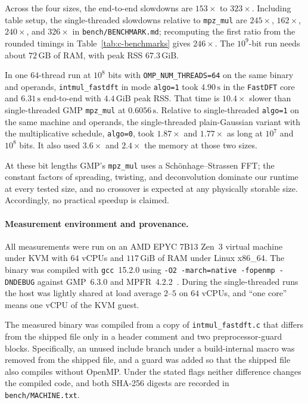 Across the four sizes, the end-to-end slowdowns are $153\times$ to $323\times$. Including table setup, the single-threaded slowdowns relative to \texttt{mpz\_mul} are $245\times$, $162\times$, $240\times$, and $326\times$ in \texttt{bench/\allowbreak BENCHMARK.md}; recomputing the first ratio from the rounded timings in Table~\ref{tab:c-benchmarks} gives $246\times$. The $10^9$-bit run needs about $72\,\mathrm{GB}$ of RAM, with peak RSS $67.3\,\mathrm{GiB}$.

In one $64$-thread run at $10^8$ bits with \texttt{OMP\_NUM\_THREADS=64} on the same binary and operands, \texttt{intmul\_fastdft} in mode \texttt{algo=1} took $4.90\,\mathrm{s}$ in the \texttt{FastDFT} core and $6.31\,\mathrm{s}$ end-to-end with $4.4\,\mathrm{GiB}$ peak RSS. That time is $10.4\times$ slower than single-threaded GMP \texttt{mpz\_mul} at $0.6056\,\mathrm{s}$. Relative to single-threaded \texttt{algo=1} on the same machine and operands, the single-threaded plain-Gaussian variant with the multiplicative schedule, \texttt{algo=0}, took $1.87\times$ and $1.77\times$ as long at $10^7$ and $10^8$ bits. It also used $3.6\times$ and $2.4\times$ the memory at those two sizes.

At these bit lengths GMP's \texttt{mpz\_mul} uses a Sch\"onhage--Strassen FFT; the constant factors of spreading, twisting, and deconvolution dominate our runtime at every tested size, and no crossover is expected at any physically storable size. Accordingly, no practical speedup is claimed.

\paragraph{Measurement environment and provenance.}
All measurements were run on an AMD EPYC 7B13 Zen~3 virtual machine under KVM with $64$ vCPUs and $117\,\mathrm{GiB}$ of RAM under Linux x86\_64. The binary was compiled with \texttt{gcc}~15.2.0 using \texttt{-O2 -march=native -fopenmp -DNDEBUG} against GMP~6.3.0 and MPFR~4.2.2~\cite{CGMP26}. During the single-threaded runs the host was lightly shared at load average $2$--$5$ on $64$ vCPUs, and ``one core'' means one vCPU of the KVM guest.

The measured binary was compiled from a copy of \texttt{intmul\_fastdft.c} that differs from the shipped file only in a header comment and two preprocessor-guard blocks. Specifically, an unused include branch under a build-internal macro was removed from the shipped file, and a guard was added so that the shipped file also compiles without OpenMP. Under the stated flags neither difference changes the compiled code, and both SHA-256 digests are recorded in \texttt{bench/MACHINE.txt}.


